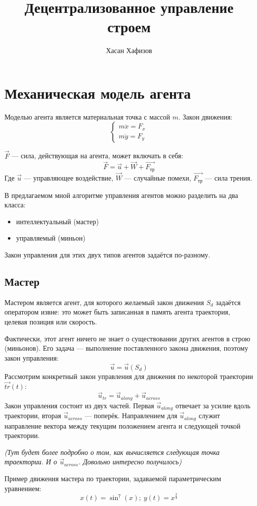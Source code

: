 \documentclass[12pt,a4paper]{article}
\author{Хасан Хафизов}
\title{Децентрализованное управление строем}
\begin{document}
	\maketitle
	
\section{Механическая модель агента}
Моделью агента является материальная точка с массой $m$. Закон движения:
$$\begin{cases} 
m \ddot{x} = F_x \\
m \ddot{y} = F_y \end{cases}
$$

$\vec{F}$ — сила, действующая на агента, может включать в себя:
$$ \vec{F} = \vec{u} + \vec{W} + \vec{F_{\text{тр}}}$$
Где $\vec{u}$ — управляющее воздействие, $\vec{W}$ — случайные помехи, $\vec{F_{\text{тр}}}$ — сила трения.
\par
В предлагаемом мной алгоритме управления агентов можно разделить на два класса:
\begin{itemize}
	\item интеллектуальный (мастер)
	\item управляемый (миньон)
\end{itemize}
Закон управления для этих двух типов агентов задаётся по-разному.
\subsection{Мастер}
Мастером является агент, для которого желаемый закон движения $S_d$ задаётся оператором извне: это может быть записанная в память агента траектория, целевая позиция или скорость. \par
Фактически, этот агент ничего не знает о существовании других агентов в строю (миньонов). Его задача — выполнение поставленного закона движения, поэтому закон управления:
$$ \vec{u} = \vec{u}(S_d)$$
Рассмотрим конкретный закон управления для движения по некоторой траектории $\vec{tr}(t)$:
$$ \vec{u}_{tr} = \vec{u}_{along} + \vec{u}_{across} $$
Закон управления состоит из двух частей. Первая $\vec{u}_{along}$ отвечает за усилие вдоль траектории, вторая $\vec{u}_{across}$ — поперёк. Направлением для $\vec{u}_{along}$ служит направление вектора между текущим положением агента и следующей точкой траектории.
\begin{center}{\textit{ (Тут будет более подробно о том, как вычисляется следующая точка траектории. И о $\vec{u}_{across}$. Довольно интересно получилось)}}
\end{center}
Пример движения мастера по траектории, задаваемой параметрическим уравнением:
$$x(t) = \sin^7(x); \ y(t) = x^{\frac{2}{3}}$$
\end{document}
